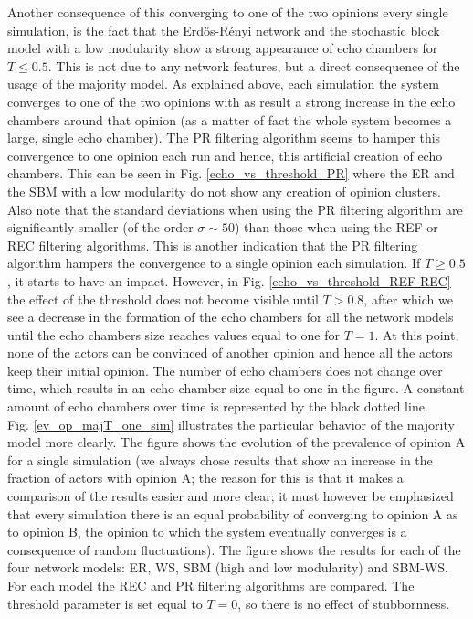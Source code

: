 \documentclass[11 pt , letterpaper , twoside , openright]{book}
\begin{document}
Another consequence of this converging to one of the two opinions every single simulation, is the fact that the Erd\H{o}s-R\'{e}nyi network and the stochastic block model with a low modularity show a strong appearance of echo chambers for $T \leqslant 0.5$. This is not due to any network features, but a direct consequence of the usage of the majority model. As explained above, each simulation the system converges to one of the two opinions with as result a strong increase in the echo chambers around that opinion (as a matter of fact the whole system becomes a large, single echo chamber). The PR filtering algorithm seems to hamper this convergence to one opinion each run and hence, this artificial creation of echo chambers. This can be seen in Fig. \ref{echo_vs_threshold_PR} where the ER and the SBM with a low modularity do not show any creation of opinion clusters. Also note that the standard deviations when using the PR filtering algorithm are significantly smaller (of the order $\sigma \sim 50$) than those when using the REF or REC filtering algorithms. This is another indication that the PR filtering algorithm hampers the convergence to a single opinion each simulation. If $T \geqslant 0.5$, it starts to have an impact. However, in Fig. \ref{echo_vs_threshold_REF-REC} the effect of the threshold does not become visible until $T > 0.8$, after which we see a decrease in the formation of the echo chambers for all the network models until the echo chambers size reaches values equal to one for $T=1$. At this point, none of the actors can be convinced of another opinion and hence all the actors keep their initial opinion. The number of echo chambers does not change over time, which results in an echo chamber size equal to one in the figure. A constant amount of echo chambers over time is represented by the black dotted line.\\
\newline
Fig. \ref{ev_op_majT_one_sim} illustrates the particular behavior of the majority model more clearly. The figure shows the evolution of the prevalence of opinion A for a single simulation (we always chose results that show an increase in the fraction of actors with opinion A; the reason for this is that it makes a comparison of the results easier and more clear; it must however be emphasized that every simulation there is an equal probability of converging to opinion A as to opinion B, the opinion to which the system eventually converges is a consequence of random fluctuations). The figure shows the results for each of the four network models: ER, WS, SBM (high and low modularity) and SBM-WS. For each model the REC and PR filtering algorithms are compared. The threshold parameter is set equal to $T=0$, so there is no effect of stubbornness.\\
\end{document}
